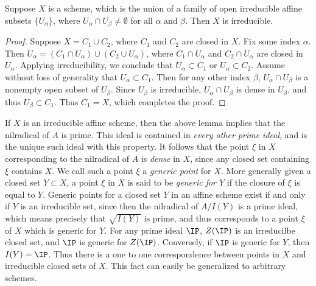 \begin{lemma}
    Suppose $X$ is a scheme, which is the union of a family of open irreducible affine subsets $\{ U_\alpha \}$, where $U_\alpha \cap U_\beta \neq \emptyset$ for all $\alpha$ and $\beta$. Then $X$ is irreducible.
\end{lemma}
\begin{proof}
    Suppose $X = C_1 \cup C_2$, where $C_1$ and $C_2$ are closed in $X$. Fix some index $\alpha$. Then $U_{\alpha} = (C_1 \cap U_{\alpha}) \cup (C_2 \cup U_{\alpha})$, where $C_1 \cap U_{\alpha}$ and $C_2 \cap U_{\alpha}$ are closed in $U_{\alpha}$. Applying irreducibility, we conclude that $U_{\alpha} \subset C_1$ or $U_{\alpha} \subset C_2$. Assume without loss of generality that $U_\alpha \subset C_1$. Then for any other index $\beta$, $U_\alpha \cap U_\beta$ is a nonempty open subset of $U_\beta$. Since $U_\beta$ is irreducible, $U_\alpha \cap U_\beta$ is dense in $U_\beta$, and thus $U_\beta \subset C_1$. Thus $C_1 = X$, which completes the proof.
\end{proof}

If $X$ is an irreducible affine scheme, then the above lemma implies that the nilradical of $A$ is prime. This ideal is contained in \emph{every other prime ideal}, and is the unique such ideal with this property. It follows that the point $\xi$ in $X$ corresponding to the nilradical of $A$ is \emph{dense} in $X$, since any closed set containing $\xi$ contains $X$. We call such a point $\xi$ a \emph{generic point} for $X$. More generally given a closed set $Y \subset X$, a point $\xi$ in $X$ is said to be \emph{generic for $Y$} if the closure of $\xi$ is equal to $Y$. Generic points for a closed set $Y$ in an affine scheme exist if and only if $Y$ is an irreducible set, since then the nilradical of $A/I(Y)$ is a prime ideal, which means precisely that $\sqrt{I(Y)}$ is prime, and thus corresponds to a point $\xi$ of $X$ which is generic for $Y$. For any prime ideal $\IP$, $Z(\IP)$ is an irreducilbe closed set, and $\IP$ is generic for $Z(\IP)$. Conversely, if $\IP$ is generic for $Y$, then $I(Y) = \IP$. Thus there is a one to one correspondence between points in $X$ and irreducible closed sets of $X$. This fact can easily be generalized to arbitrary schemes.

